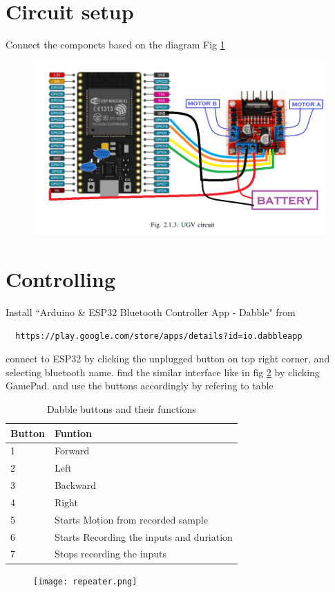 \documentclass[journal,12pt,twocolumn]{IEEEtran}
\begin{document}
\section{Circuit setup}
Connect the componets based on the diagram Fig \ref{fig:circuit}
\begin{center}
\begin{figure}[!ht]
    \centering
    \includegraphics[width=\columnwidth]{circuit.png}
    \caption{}
    \label{fig:circuit}
\end{figure}
\end{center}
\section{Controlling}
Install ``Arduino \& ESP32 Bluetooth Controller App - Dabble" from 
\begin{lstlisting}
  https://play.google.com/store/apps/details?id=io.dabbleapp
\end{lstlisting}
connect to ESP32 by clicking the unplugged button on top right corner, and selecting bluetooth name. find the similar interface like in fig \ref{fig:repeat} by clicking GamePad. and use the buttons accordingly by refering to table
\begin{table}[]
    \centering
    \caption{Dabble buttons and their functions}
    \begin{tabular}{ |m{1.5cm}| m{15.8em} |}

 \hline
 \textbf{Button} &  \textbf{Funtion} \\ [1ex] 
 \hline\hline
 1 & Forward\\
 \hline
 2 & Left\\
 \hline
 3 & Backward\\
 \hline
 4 & Right\\
 \hline
 5 & Starts Motion from recorded sample\\  
 \hline
 6 & Starts Recording the inputs and duriation\\ 
 \hline
 7 & Stops recording the inputs \\ [0.5ex]
 \hline
 
\end{tabular}
\label{tab:1}
    
\end{table}
\renewcommand{\thetable}{\theproblem}

\begin{center}
\begin{figure}[!ht]
    \centering
    \texttt{[image: repeater.png]}
    \caption{}
    \label{fig:repeat}
\end{figure}
\end{center}
\end{document}
